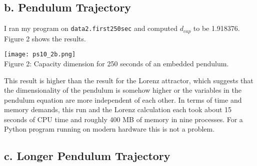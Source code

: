 \documentclass[12pt, letterpaper]{article}
\begin{document}
\subsection*{b. Pendulum Trajectory}

I ran my program on \texttt{data2.first250sec} and computed $d_{cap}$ to be
1.918376. Figure 2 shows the results.

\begin{center}
\texttt{[image: ps10\_2b.png]}
\\
Figure 2: Capacity dimension for 250 seconds of an embedded pendulum.
\end{center}

This result is higher than the result for the Lorenz attractor, which suggests
that the dimensionality of the pendulum is somehow higher or the variables in
the pendulum equation are more independent of each other. In terms of time and
memory demands, this run and the Lorenz calculation each took about 15 seconds
of CPU time and roughly 400 MB of memory in nine processes. For a Python program
running on modern hardware this is not a problem.

\subsection*{c. Longer Pendulum Trajectory}
\end{document}
